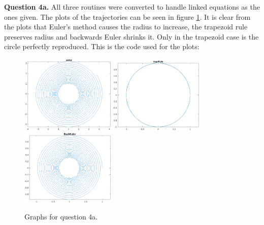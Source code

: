 \documentclass[letterpaper, reqno,11pt]{article}
\begin{document}
{\medskip\noindent\bf Question 4a.} All three routines were converted to handle linked equations as the ones given. The plots of the trajectories can be seen in figure \ref{fig:q4a}. It is clear from the plots that Euler's method causes the radius to increase, the trapezoid rule preserves radius and backwards Euler shrinks it. Only in the trapezoid case is the circle perfectly reproduced. This is the code used for the plots:

\begin{figure}[htpb]
    \centering
    \includegraphics[width=0.4\textwidth]{q4a1}
    \includegraphics[width=0.4\textwidth]{q4a2}
    \includegraphics[width=0.4\textwidth]{q4a3}
    \caption{Graphs for question 4a.}
    \label{fig:q4a}
\end{figure}
\end{document}
